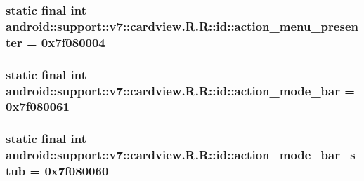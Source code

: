 \hypertarget{classandroid_1_1support_1_1v7_1_1cardview_1_1_r_1_1id_b22db436e43419404ae85fa9d0fa5026}{
\subsubsection[{action\_\-menu\_\-presenter}]{\setlength{\rightskip}{0pt plus 5cm}static final int android::support::v7::cardview.R.R::id::action\_\-menu\_\-presenter = 0x7f080004}}
\label{classandroid_1_1support_1_1v7_1_1cardview_1_1_r_1_1id_b22db436e43419404ae85fa9d0fa5026}


\hypertarget{classandroid_1_1support_1_1v7_1_1cardview_1_1_r_1_1id_a6614f395ffe5e5089764039af8648e1}{
\subsubsection[{action\_\-mode\_\-bar}]{\setlength{\rightskip}{0pt plus 5cm}static final int android::support::v7::cardview.R.R::id::action\_\-mode\_\-bar = 0x7f080061}}
\label{classandroid_1_1support_1_1v7_1_1cardview_1_1_r_1_1id_a6614f395ffe5e5089764039af8648e1}


\hypertarget{classandroid_1_1support_1_1v7_1_1cardview_1_1_r_1_1id_d806f6b4300d250447c1bec216ece6d4}{
\subsubsection[{action\_\-mode\_\-bar\_\-stub}]{\setlength{\rightskip}{0pt plus 5cm}static final int android::support::v7::cardview.R.R::id::action\_\-mode\_\-bar\_\-stub = 0x7f080060}}
\label{classandroid_1_1support_1_1v7_1_1cardview_1_1_r_1_1id_d806f6b4300d250447c1bec216ece6d4}


